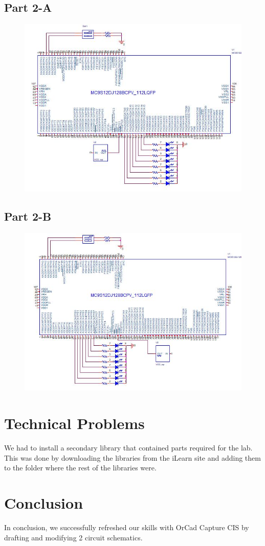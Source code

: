 \documentclass{article}
\begin{document}
	\subsection*{Part 2-A}
	\begin{figure}[H]
		\centering
		\includegraphics[width=1\textwidth]{part2}
	\end{figure}
	\subsection*{Part 2-B}
	\begin{figure}[H]
		\centering
		\includegraphics[width=1\textwidth]{part2b}
	\end{figure}
	
	\section*{Technical Problems}
	We had to install a secondary library that contained parts required for the lab. This was done by downloading the libraries from the iLearn site and adding them to the folder where the rest of the libraries were.
	\section*{Conclusion}
	In conclusion, we successfully refreshed our skills with OrCad Capture CIS by drafting and modifying 2 circuit schematics.
\end{document}
